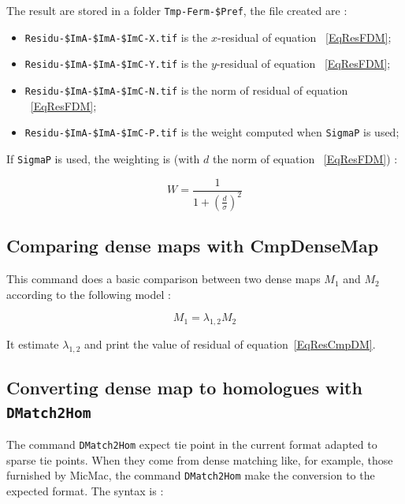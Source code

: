 The result are stored in a folder {\tt Tmp-Ferm-\${Pref}}, the file created are :

\begin{itemize}
   \item  {\tt Residu-\${ImA}-\${ImA}-\${ImC}-X.tif} is the $x$-residual of equation ~\ref{EqResFDM};
   \item  {\tt Residu-\${ImA}-\${ImA}-\${ImC}-Y.tif} is the $y$-residual of equation ~\ref{EqResFDM};
   \item  {\tt Residu-\${ImA}-\${ImA}-\${ImC}-N.tif} is the  norm of residual of equation ~\ref{EqResFDM};
   \item  {\tt Residu-\${ImA}-\${ImA}-\${ImC}-P.tif} is the  weight computed when {\tt SigmaP} is used;
\end{itemize}

If {\tt SigmaP} is used, the weighting is (with $d$ the norm of equation ~\ref{EqResFDM}) :

\begin{equation}
  W = \frac{1}{1+(\frac{d}{\sigma})^2}
\end{equation}


\subsection{Comparing dense maps with CmpDenseMap}

\label{CmpDenseMap}

This command does a basic comparison between two dense maps $M_1$ and
$M_2$ according to the following model :

\begin{equation}
M_1 = \lambda_{1,2} M_2 \label{EqResCmpDM}
\end{equation}

It estimate $\lambda_{1,2}$ and print the value of residual of 
equation~\ref{EqResCmpDM}.


\subsection{Converting dense map to homologues with {\tt DMatch2Hom}}

\label{DMatch2Hom}

The command {\tt DMatch2Hom} expect tie point in the current format adapted
to sparse tie points. When they come from dense matching like, for example,
those furnished by MicMac, the command {\tt DMatch2Hom} make the conversion
to the expected format. The syntax is : 



